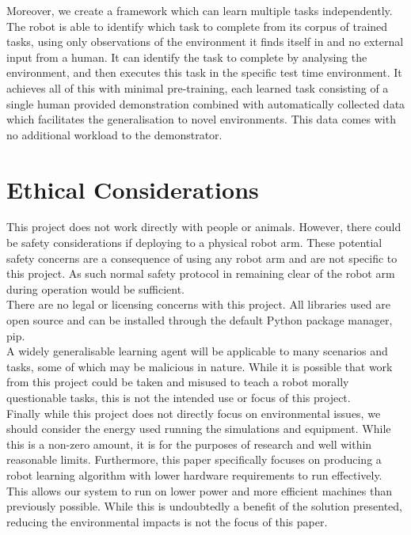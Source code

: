 Moreover, we create a framework which can learn multiple tasks independently. The robot is able to identify which task to complete from its corpus of trained tasks, using only observations of the environment it finds itself in and no external input from a human. It can identify the task to complete by analysing the environment, and then executes this task in the specific test time environment. It achieves all of this with minimal pre-training, each learned task consisting of a single human provided demonstration combined with automatically collected data which facilitates the generalisation to novel environments. This data comes with no additional workload to the demonstrator.\\

\section{Ethical Considerations}
This project does not work directly with people or animals. However, there could be safety considerations if deploying to a physical robot arm. These potential safety concerns are a consequence of using any robot arm and are not specific to this project. As such normal safety protocol in remaining clear of the robot arm during operation would be sufficient.\\

There are no legal or licensing concerns with this project. All libraries used are open source and can be installed through the default Python package manager, pip.\\

A widely generalisable learning agent will be applicable to many scenarios and tasks, some of which may be malicious in nature. While it is possible that work from this project could be taken and misused to teach a robot morally questionable tasks, this is not the intended use or focus of this project.\\

Finally while this project does not directly focus on environmental issues, we should consider the energy used running the simulations and equipment. While this is a non-zero amount, it is for the purposes of research and well within reasonable limits. Furthermore, this paper specifically focuses on producing a robot learning algorithm with lower hardware requirements to run effectively. This allows our system to run on lower power and more efficient machines than previously possible. While this is undoubtedly a benefit of the solution presented, reducing the environmental impacts is not the focus of this paper.